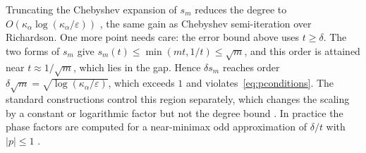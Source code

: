 \documentclass[11pt,a4paper]{article}
\theoremstyle{remark}
\begin{document}
Truncating the Chebyshev expansion of $s_m$ reduces the degree to
$O(\kappa_\alpha\log(\kappa_\alpha/\varepsilon))$ \cite{CKS17,GSLW19}, the same gain as Chebyshev
semi-iteration over Richardson. One more point needs care: the error bound
above uses $t\ge\delta$. The two forms of $s_m$ give $s_m(t)\le\min(mt,1/t)\le\sqrt m$, and
this order is attained near $t\approx1/\sqrt m$, which lies in the gap. Hence $\delta s_m$
reaches order $\delta\sqrt m=\sqrt{\log(\kappa_\alpha/\varepsilon)}$, which exceeds $1$ and
violates~\eqref{eq:pconditions}. The
standard constructions control this region separately, which changes the
scaling by a constant or logarithmic factor but not the degree bound
\cite{CKS17,GSLW19}. In practice the phase factors are computed for a
near-minimax odd approximation of $\delta/t$ with $|p|\le1$ \cite{DMWL21}.
\end{document}
